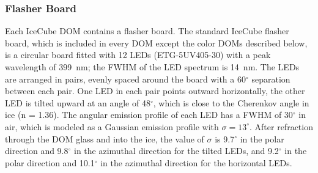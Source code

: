 
\subsubsection{\label{sec:flasher}Flasher Board}

Each IceCube DOM contains a flasher board. The standard IceCube
flasher board, which is included in every DOM except the color DOMs
described below, is a circular board fitted with 12 LEDs (ETG-5UV405-30) with a peak
wavelength of 399~nm; the FWHM of the LED spectrum is
14~nm. The LEDs are arranged in pairs, evenly spaced around the board
with a 60$^{\circ}$ separation between each pair. One LED in each pair
points outward horizontally, the other LED is tilted upward at an angle
of 48$^{\circ}$, which is close to the Cherenkov angle in ice (n =
1.36). The angular emission profile of each LED has a FWHM of
30$^{\circ}$ in air, which is modeled as a Gaussian emission profile
with $\sigma = 13^{\circ}$. After refraction through the DOM glass and into
the ice, the value of $\sigma$ is 9.7$^{\circ}$ in the polar direction
and 9.8$^{\circ}$ in the azimuthal direction for the tilted LEDs, and  9.2$^{\circ}$ in the polar direction
and 10.1$^{\circ}$ in the azimuthal direction for the horizontal LEDs.

